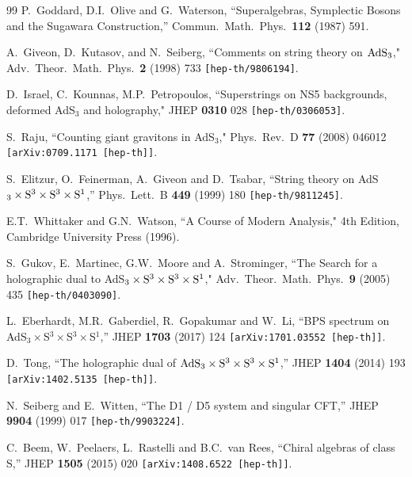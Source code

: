 \documentclass[12pt,a4paper]{article}
\begin{document}
\begin{thebibliography}{99}
P.~Goddard, D.I.~Olive and G.~Waterson,
``Superalgebras, Symplectic Bosons and the Sugawara Construction,''
Commun.\ Math.\ Phys.\  {\bf 112} (1987) 591.

A.~Giveon, D.~Kutasov, and N.~Seiberg, 
``Comments on string theory on ${\rm AdS}_{3}$,"
Adv.\ Theor.\ Math.\ Phys.\ {\bf 2} (1998) 733
{\tt [hep-th/9806194]}.

D.~Israel, C.~Kounnas, M.P.~Petropoulos,
``Superstrings on NS5 backgrounds, deformed AdS$_3$ and holography,"
JHEP {\bf 0310} 028 
{\tt  [hep-th/0306053]}.
 
S.~Raju, 
``Counting giant gravitons in AdS$_3$,"
Phys.\ Rev.\ D {\bf 77} (2008) 046012
{\tt [arXiv:0709.1171 [hep-th]]}. 

S.~Elitzur, O.~Feinerman, A.~Giveon and D.~Tsabar,
``String theory on AdS$_3 \times {\rm S}^3 \times {\rm S}^3 \times {\rm S}^1$,''
Phys.\ Lett.\ B {\bf 449} (1999) 180
{\tt [hep-th/9811245]}.

E.T.~Whittaker and G.N.~Watson,  
``A Course of Modern Analysis," 
4th Edition, Cambridge University Press (1996).

S.~Gukov, E.~Martinec, G.W.~Moore and A.~Strominger,
``The Search for a holographic dual to AdS$_3 \times {\rm S}^3 \times {\rm S}^3 \times {\rm S}^1$,"
Adv.\ Theor.\ Math.\ Phys.\  {\bf 9} (2005) 435
{\tt [hep-th/0403090]}.

L.~Eberhardt, M.R.~Gaberdiel, R.~Gopakumar and W.~Li,
``BPS spectrum on AdS$_3\times $S$^3 \times $S$^3 \times $S$^1$,''
JHEP {\bf 1703} (2017) 124
{\tt [arXiv:1701.03552 [hep-th]]}.

D.~Tong,
``The holographic dual of ${\rm AdS}_{3} \times  {\rm S}^{3} \times {\rm S}^{3} \times {\rm S}^{1}$,''
JHEP {\bf 1404} (2014) 193
{\tt  [arXiv:1402.5135 [hep-th]]}.

 N.~Seiberg and E.~Witten,
 ``The D1 / D5 system and singular CFT,''
 JHEP {\bf 9904} (1999) 017
{\tt [hep-th/9903224]}.   

C.~Beem, W.~Peelaers, L.~Rastelli and B.C.~van Rees,
``Chiral algebras of class S,''
JHEP {\bf 1505} (2015) 020
{\tt [arXiv:1408.6522 [hep-th]]}.      


\end{thebibliography}
\end{document}
